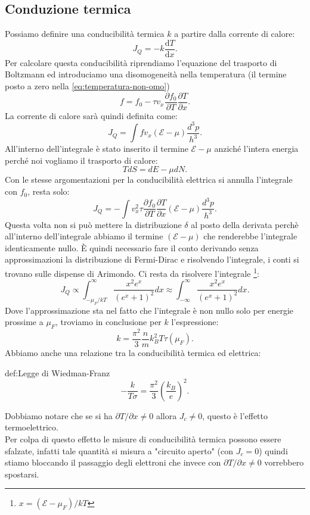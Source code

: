 \subsection{Conduzione termica}
\label{subsubsec:conduzione termica}
Possiamo definire una conducibilità termica $k$ a partire dalla corrente di calore:
\[
	J_Q 
	=
	-k \frac{\mbox{d} T}{\mbox{d} x} 
.\] 
Per calcolare questa conducibilità riprendiamo l'equazione del trasporto di Boltzmann ed introduciamo una disomogeneità nella temperatura (il termine posto a zero nella \ref{eq:temperatura-non-omo})
\[
	f 
	= 
	f_0
	-
	\tau v_x 
	\frac{\partial f_0}{\partial T} \frac{\partial T}{\partial x} 
.\] 
La corrente di calore sarà quindi definita come:
\[
	J_Q 
	=
	\int f v_x \left( \mathcal{E} - \mu  \right)  
	\frac{d^3 p}{h^3}
.\] 
All'interno dell'integrale è stato inserito il termine $\mathcal{E} - \mu $ anziché l'intera energia perché noi vogliamo il trasporto di calore:
\[
	TdS= dE - \mu dN
.\] 
Con le stesse argomentazioni per la conducibilità elettrica si annulla l'integrale con $f_0$, resta solo:
\[
	J_Q 
	=
	-\int v_x^2\tau 
		\frac{\partial f_0}{\partial T} \frac{\partial T}{\partial x} 
		\left( \mathcal{E} -\mu  \right) 
		\frac{d^3 p}{h^3}
.\] 
Questa volta non si può mettere la distribuzione $\delta $ al posto della derivata perchè all'interno dell'integrale abbiamo il termine $( \mathcal{E} - \mu)$ che renderebbe l'integrale identicamente nullo. 
È quindi necessario fare il conto derivando senza approssimazioni la distribuzione di Fermi-Dirac e risolvendo l'integrale, i conti si trovano sulle dispense di Arimondo. 
Ci resta da risolvere l'integrale \footnote{$x = \left( \mathcal{E} - \mu_F \right) /kT$}:
\[
	J_Q 
	\propto 
	\int_{-\mu_F /kT}^{\infty} \frac{x^2 e^x}{\left( e^x + 1 \right)^2}dx
	\approx
	\int_{-\infty}^{\infty} \frac{x^2 e^x}{\left( e^x + 1 \right)^2}dx
.\] 
Dove l'approssimazione sta nel fatto che l'integrale è non nullo solo per energie prossime a $\mu_F$, troviamo in conclusione per $k$ l'espressione:
\[
	k = \frac{\pi^2}{3} \frac{n}{m} k_B^2 T \tau ( \mu_F) 
.\] 
Abbiamo anche una relazione tra la conducibilità termica ed elettrica:
\begin{defn}{def:Legge di Wiedman-Franz}
	\[
		- \frac{k}{T\sigma } 
		=
		\frac{\pi^2}{3}\left( \frac{k_B}{e} \right)^2
	.\] 
\end{defn}
Dobbiamo notare che se si ha $\partial T /\partial x  \neq 0$ allora $J_c \neq 0$, questo è l'effetto termoelettrico. \\
Per colpa di questo effetto le misure di conducibilità termica possono essere sfalzate, infatti tale quantità si misura a "circuito aperto" (con $J_c = 0$) quindi stiamo bloccando il passaggio degli elettroni che invece con $\partial T / \partial x \neq 0 $ vorrebbero spostarsi.\\
